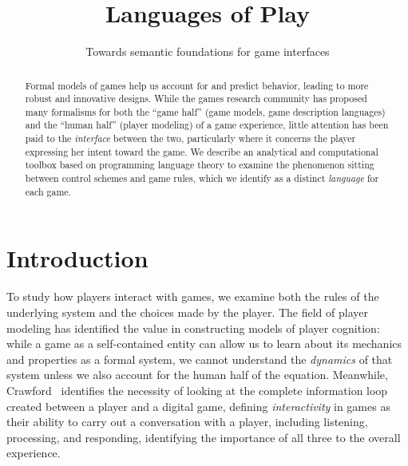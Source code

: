 \documentclass[sigconf]{acmart}
\begin{document}
\title{Languages of Play}
\subtitle{Towards semantic foundations for game interfaces}


% 


\begin{abstract}
Formal models of games help us account for and predict behavior, leading to
more robust and innovative designs. While the games research community has 
proposed many formalisms for both the ``game half'' (game models, game
description languages) and the ``human half'' (player modeling) of a game
experience, little attention has been paid to the {\em interface} between
the two, particularly where it concerns the player expressing her intent
toward the game. We describe an analytical and computational toolbox based
on programming language theory to examine the phenomenon sitting between
control schemes and game rules, which we identify as a distinct {\em
language} for each game.
\end{abstract}



\maketitle

\section{Introduction}

To study how players interact with games, we examine both the rules of the
underlying system and the choices made by the player. 
The field of player modeling has identified the
value in constructing models of player cognition: while a game as
a self-contained entity can allow us to learn about its mechanics and
properties as a formal system, we cannot understand the {\em dynamics} of
that system unless we also account for the human half of the equation.
Meanwhile, Crawford~\cite{crawford2003chris} identifies the necessity of
looking at the complete information loop created between a player and a
digital game, defining {\em interactivity} in games as their ability to
carry out a conversation with a player, including listening, processing,
and responding, identifying the importance of all three to the overall
experience.
\end{document}
